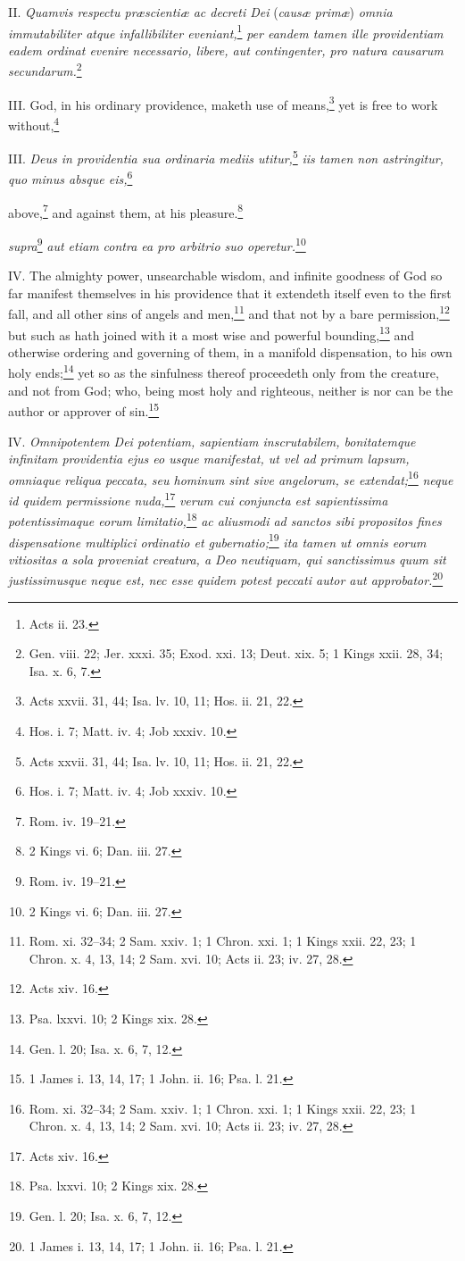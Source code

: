 II. \emph{Quamvis respectu præscientiæ ac decreti Dei} (\emph{causæ primæ}) \emph{omnia immutabiliter atque infallibiliter eveniant,}\footnote{Acts ii. 23.}\emph{ per eandem tamen ille providentiam eadem ordinat evenire necessario, libere, aut contingenter, pro natura causarum secundarum.}\footnote{Gen. viii. 22; Jer. xxxi. 35; Exod. xxi. 13; Deut. xix. 5; 1 Kings xxii. 28, 34; Isa. x. 6, 7.}

III. God, in his ordinary providence, maketh use of means,\footnote{Acts xxvii. 31, 44; Isa. lv. 10, 11; Hos. ii. 21, 22.} yet is free to work without,\footnote{Hos. i. 7; Matt. iv. 4; Job xxxiv. 10.}

III. \emph{Deus in providentia sua ordinaria mediis utitur,}\footnote{Acts xxvii. 31, 44; Isa. lv. 10, 11; Hos. ii. 21, 22.}\emph{ iis tamen non astringitur, quo minus absque eis,}\footnote{Hos. i. 7; Matt. iv. 4; Job xxxiv. 10.}

above,\footnote{Rom. iv. 19–21.} and against them, at his pleasure.\footnote{2 Kings vi. 6; Dan. iii. 27.}

\emph{supra}\footnote{Rom. iv. 19–21.}\emph{ aut etiam contra ea pro arbitrio suo operetur.}\footnote{2 Kings vi. 6; Dan. iii. 27.}

IV. The almighty power, unsearchable wisdom, and infinite goodness of God so far manifest themselves in his providence that it extendeth itself even to the first fall, and all other sins of angels and men,\footnote{Rom. xi. 32–34; 2 Sam. xxiv. 1; 1 Chron. xxi. 1; 1 Kings xxii. 22, 23; 1 Chron. x. 4, 13, 14; 2 Sam. xvi. 10; Acts ii. 23; iv. 27, 28.} and that not by a bare permission,\footnote{Acts xiv. 16.} but such as hath joined with it a most wise and powerful bounding,\footnote{Psa. lxxvi. 10; 2 Kings xix. 28.} and otherwise ordering and governing of them, in a manifold dispensation, to his own holy ends;\footnote{Gen. l. 20; Isa. x. 6, 7, 12.} yet so as the sinfulness thereof proceedeth only from the creature, and not from God; who, being most holy and righteous, neither is nor can be the author or approver of sin.\footnote{1 James i. 13, 14, 17; 1 John. ii. 16; Psa. l. 21.}

IV.\emph{ Omnipotentem Dei potentiam, sapientiam inscrutabilem, bonitatemque infinitam providentia ejus eo usque manifestat, ut vel ad primum lapsum, omniaque reliqua peccata, seu hominum sint sive angelorum, se extendat;}\footnote{Rom. xi. 32–34; 2 Sam. xxiv. 1; 1 Chron. xxi. 1; 1 Kings xxii. 22, 23; 1 Chron. x. 4, 13, 14; 2 Sam. xvi. 10; Acts ii. 23; iv. 27, 28.}\emph{ neque id quidem permissione nuda,}\footnote{Acts xiv. 16.}\emph{ verum cui conjuncta est sapientissima potentissimaque eorum limitatio,}\footnote{Psa. lxxvi. 10; 2 Kings xix. 28.}\emph{ ac aliusmodi ad sanctos sibi propositos fines dispensatione multiplici ordinatio et gubernatio;}\footnote{Gen. l. 20; Isa. x. 6, 7, 12.}\emph{ ita tamen ut omnis eorum vitiositas a sola proveniat creatura, a Deo neutiquam, qui sanctissimus quum sit justissimusque neque est, nec esse quidem potest peccati autor aut approbator.}\footnote{1 James i. 13, 14, 17; 1 John. ii. 16; Psa. l. 21.}

